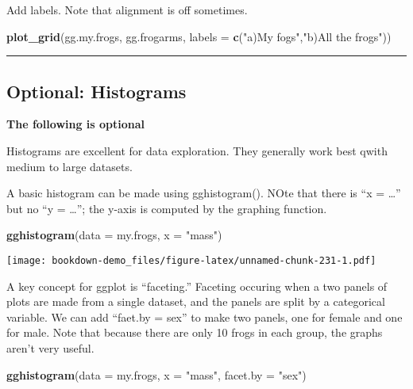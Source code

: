 \documentclass[]{book}
\newenvironment{Shaded}{\begin{snugshade}}{\end{snugshade}}
\newcommand{\KeywordTok}[1]{\textcolor[rgb]{0.13,0.29,0.53}{\textbf{#1}}}
\newcommand{\DataTypeTok}[1]{\textcolor[rgb]{0.13,0.29,0.53}{#1}}
\newcommand{\StringTok}[1]{\textcolor[rgb]{0.31,0.60,0.02}{#1}}
\newcommand{\NormalTok}[1]{#1}
\theoremstyle{definition}
\theoremstyle{definition}
\theoremstyle{definition}
\theoremstyle{remark}
\begin{document}
Add labels. Note that alignment is off sometimes.

\begin{Shaded}
\begin{Highlighting}[]
\KeywordTok{plot_grid}\NormalTok{(gg.my.frogs, }
\NormalTok{          gg.frogarms,}
          \DataTypeTok{labels =} \KeywordTok{c}\NormalTok{(}\StringTok{"a)My fogs"}\NormalTok{,}\StringTok{"b)All the frogs"}\NormalTok{))}
\end{Highlighting}
\end{Shaded}

\begin{center}\rule{0.5\linewidth}{\linethickness}\end{center}

\subsection{Optional: Histograms}\label{optional-histograms}

\textbf{The following is optional}

Histograms are excellent for data exploration. They generally work best
qwith medium to large datasets.

A basic histogram can be made using gghistogram(). NOte that there is
``x = \ldots{}'' but no ``y = \ldots{}''; the y-axis is computed by the
graphing function.

\begin{Shaded}
\begin{Highlighting}[]
\KeywordTok{gghistogram}\NormalTok{(}\DataTypeTok{data =}\NormalTok{ my.frogs, }
            \DataTypeTok{x =} \StringTok{"mass"}\NormalTok{)}
\end{Highlighting}
\end{Shaded}

\texttt{[image: bookdown-demo\_files/figure-latex/unnamed-chunk-231-1.pdf]}

A key concept for ggplot is ``faceting.'' Faceting occuring when a two
panels of plots are made from a single dataset, and the panels are split
by a categorical variable. We can add ``faet.by = sex'' to make two
panels, one for female and one for male. Note that because there are
only 10 frogs in each group, the graphs aren't very useful.

\begin{Shaded}
\begin{Highlighting}[]
\KeywordTok{gghistogram}\NormalTok{(}\DataTypeTok{data =}\NormalTok{ my.frogs, }
            \DataTypeTok{x =} \StringTok{"mass"}\NormalTok{,}
            \DataTypeTok{facet.by =} \StringTok{"sex"}\NormalTok{)}
\end{Highlighting}
\end{Shaded}
\end{document}
